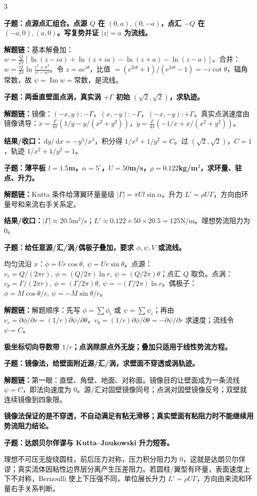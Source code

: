 \documentclass[a4paper]{article}
\newcommand{\qt}[1]{\vspace{0.25pt}\colorbox{Q}{\parbox{\dimexpr\linewidth-2\fboxsep}{\color{white}\bfseries #1}}\par}
\newcommand{\ans}[1]{\colorbox{G}{\parbox{\dimexpr\linewidth-2\fboxsep}{#1}}\par}
\newcommand{\warn}[1]{\colorbox{Y}{\parbox{\dimexpr\linewidth-2\fboxsep}{\color{E}\bfseries #1}}\par}
\newcommand{\chain}[1]{{\color{A}\bfseries 解题链：}#1\par}
\newcommand{\res}[1]{{\color{E}\bfseries 结果/收口：}#1\par}
\newcommand{\dd}{\,\mathrm d}
\begin{document}
\begin{multicols}{3}
\qt{子题：点源点汇组合。点源 $Q$ 在 $(0,a),(0,-a)$，点汇 $-Q$ 在 $(-a,0),(a,0)$。写复势并证 $|z|=a$ 为流线。}
\chain{基本解叠加：$w=\frac{Q}{2\pi}[\ln(z-ia)+\ln(z+ia)-\ln(z+a)-\ln(z-a)]$。合并：$w=\frac{Q}{2\pi}\ln\frac{z^2+a^2}{z^2-a^2}$。令 $z=ae^{i\theta}$，比值 $=(e^{2i\theta}+1)/(e^{2i\theta}-1)=-i\cot\theta$，辐角常数，故 $\psi=\operatorname{Im}w=$常数，是流线。}

\qt{子题：两垂直壁面点涡，真实涡 $+\Gamma$ 初始 $(\sqrt2,\sqrt2)$，求轨迹。}
\chain{镜像：$(-x,y):-\Gamma$，$(x,-y):-\Gamma$，$(-x,-y):+\Gamma$。真实点涡速度由镜像诱导：$\dot x=\frac{\Gamma}{4\pi}(1/y-y/(x^2+y^2))$，$\dot y=\frac{\Gamma}{4\pi}(-1/x+x/(x^2+y^2))$。}
\res{$\dd y/\dd x=-y^3/x^3$，积分得 $1/x^2+1/y^2=C$。过 $(\sqrt2,\sqrt2)$，$C=1$，轨迹 $1/x^2+1/y^2=1$。}

\qt{子题：薄平板 $l=1.5$m，$\alpha=5^\circ$，$U=50$m/s，$\rho=0.122$kg/m$^3$，求环量、驻点、升力。}
\chain{Kutta 条件给薄翼环量量级 $|\Gamma|=\pi Ul\sin\alpha$。升力 $L'=\rho U\Gamma$，方向由环量号和来流右手关系定。}
\res{$|\Gamma|\approx20.5$m$^2$/s；$L'\approx0.122\times50\times20.5=125$N/m。理想势流阻力为 0。}

\qt{子题：给任意源/汇/涡/偶极子叠加，要求 $\phi,\psi,V$ 或流线。}
\ans{均匀流沿 $x$：$\phi=Ur\cos\theta,\ \psi=Ur\sin\theta$。点源：$v_r=Q/(2\pi r),\ \phi=(Q/2\pi)\ln r,\ \psi=(Q/2\pi)\theta$；点汇 $Q$ 取负。点涡：$v_\theta=\Gamma/(2\pi r),\ \phi=(\Gamma/2\pi)\theta,\ \psi=-(\Gamma/2\pi)\ln r$。偶极子：$\phi=M\cos\theta/r,\ \psi=-M\sin\theta/r$。}
\chain{解题顺序：先写 $\phi=\sum\phi_i$ 或 $\psi=\sum\psi_i$；再由 $v_r=\partial\phi/\partial r=(1/r)\partial\psi/\partial\theta$，$v_\theta=(1/r)\partial\phi/\partial\theta=-\partial\psi/\partial r$ 求速度；流线令 $\psi=C$。}
\warn{极坐标切向导数带 $1/r$；点涡除原点外无旋；叠加只适用于线性势流方程。}

\qt{子题：镜像法，给壁面附近源/汇/涡，求壁面不穿透或涡轨迹。}
\chain{第一眼：直壁、角壁、地面、对称面。镜像目的让壁面成为一条流线 $\psi=C$，即法向速度为 0。源/汇对固壁镜像同号；点涡对固壁镜像反号；双壁就连续镜像到四象限。}
\warn{镜像法保证的是不穿透，不自动满足有粘无滑移；真实壁面有粘阻力时不能继续用势流阻力结论。}

\qt{子题：达朗贝尔佯谬与 Kutta--Joukowski 升力短答。}
\ans{理想不可压无旋绕圆柱，前后压力对称，压力积分阻力为 0，这就是达朗贝尔佯谬；真实流体因粘性边界层分离产生压差阻力。若圆柱/翼型有环量，表面速度上下不对称，Bernoulli 使上下压强不同，单位展长升力 $L'=\rho U\Gamma$，方向由来流和环量右手关系判断。}



\end{multicols}
\end{document}
